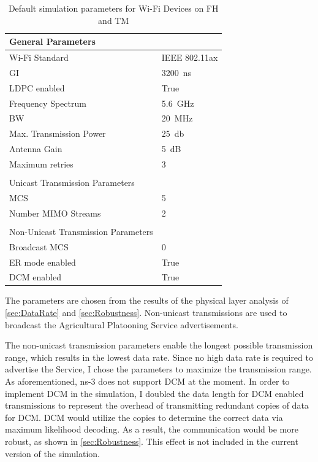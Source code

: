 \begin{table}[H]
   \centering
   \begin{tabular}{p{6cm}p{4cm}}
      General Parameters & \\
      \midrule
      Wi-Fi Standard & IEEE 802.11ax\\
      \ac{GI} & \SI{3200}{\nano\second}\\
      \ac{LDPC} enabled & True\\
      Frequency Spectrum & \SI{5.6}{\giga\hertz}\\
      \ac{BW} & \SI{20}{\mega\hertz}\\
      Max. Transmission Power & \SI{25}{\decibel}\\
      Antenna Gain & \SI{5}{\dB}\\
      Maximum retries & \num{3}\\
       & \\
      Unicast Transmission Parameters & \\
      \midrule
      \ac{MCS} & \num{5}\\
      Number \ac{MIMO} Streams & \num{2}\\
       & \\
      Non-Unicast Transmission Parameters & \\
      \midrule
      Broadcast \ac{MCS} & \num{0}\\
      \ac{ER} mode enabled & True\\
      \ac{DCM} enabled & True\\
   \end{tabular}
   \caption{Default simulation parameters for Wi-Fi Devices on \acf{FH} and \acf{TM}}
   \label{tab:SimulationParametersWiFi}
\end{table}

The parameters are chosen from the results of the physical layer analysis of \autoref{sec:DataRate} and \autoref{sec:Robustness}.
Non-unicast transmissions are used to broadcast the Agricultural Platooning Service advertisements.

The non-unicast transmission parameters enable the longest possible
transmission range, which results in the lowest data rate.
Since no high data rate is required to advertise the Service, I chose the parameters to maximize the transmission range.
As aforementioned, ns-3 does not support \ac{DCM} at the moment.
In order to implement \ac{DCM} in the simulation, I doubled the data length for \ac{DCM} enabled transmissions to
represent the overhead of transmitting redundant copies of data for \ac{DCM}. \ac{DCM} would utilize the copies to determine the
correct data via maximum likelihood decoding.
As a result, the communication would be more robust, as shown in \autoref{sec:Robustness}.
This effect is not included in the current version of the simulation.

